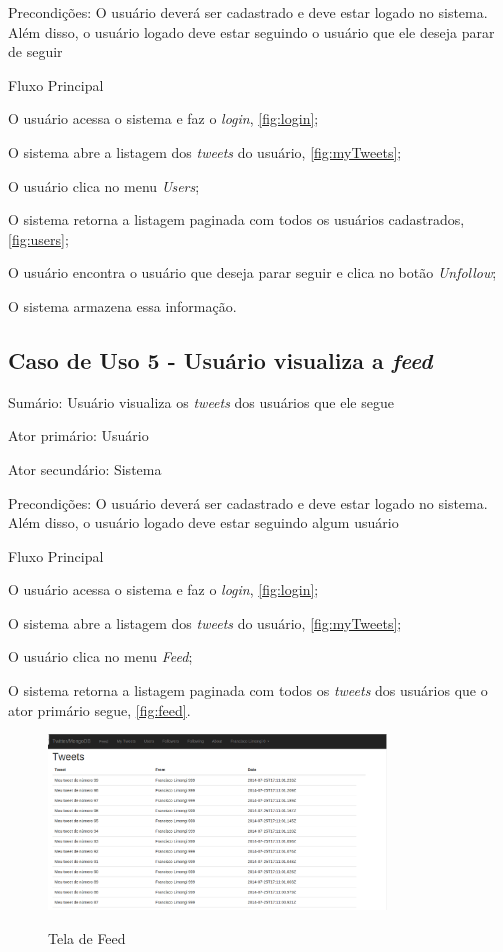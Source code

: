Precondições: O usuário deverá ser cadastrado e deve estar logado no sistema. Além disso, o usuário logado deve estar seguindo o usuário que ele deseja parar de seguir

Fluxo Principal
\begin{enumerate}
{\setlength\itemindent{25pt}
\item O usuário acessa o sistema e faz o \textit{login}, \autoref{fig:login};
\item O sistema abre a listagem dos \textit{tweets} do usuário, \autoref{fig:myTweets};
\item O usuário clica no menu \textit{Users};
\item O sistema retorna a listagem paginada com todos os usuários cadastrados, \autoref{fig:users};
\item O usuário encontra o usuário que deseja parar seguir e clica no botão \textit{Unfollow};
\item O sistema armazena essa informação.
}
\end{enumerate}

\subsection{Caso de Uso 5 - Usuário visualiza a \textit{feed}}
\label{subsec:useCaseFeed}

Sumário: Usuário visualiza os \textit{tweets} dos usuários que ele segue

Ator primário: Usuário

Ator secundário: Sistema

Precondições: O usuário deverá ser cadastrado e deve estar logado no sistema. Além disso, o usuário logado deve estar seguindo algum usuário

Fluxo Principal
\begin{enumerate}
{\setlength\itemindent{25pt}
\item O usuário acessa o sistema e faz o \textit{login}, \autoref{fig:login};
\item O sistema abre a listagem dos \textit{tweets} do usuário, \autoref{fig:myTweets};
\item O usuário clica no menu \textit{Feed};
\item O sistema retorna a listagem paginada com todos os \textit{tweets} dos usuários que o ator primário segue, \autoref{fig:feed}.
}
\end{enumerate}

\begin{figure}[H]
    \centering
    \caption{Tela de Feed}
    \includegraphics[width=0.8\textwidth]{./04-figuras/feed.png}
    \label{fig:feed}
\end{figure}


